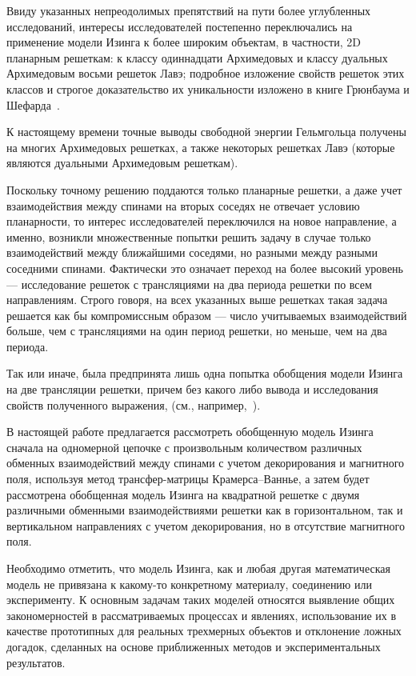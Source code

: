 Ввиду указанных непреодолимых препятствий на пути более углубленных исследований, интересы исследователей постепенно переключались на применение модели Изинга к более широким объектам, в частности, 2D планарным решеткам: к классу одиннадцати Архимедовых и классу дуальных Архимедовым восьми решеток Лавэ; подробное изложение свойств решеток этих классов и строгое доказательство их уникальности изложено в книге Грюнбаума и Шефарда~\cite{grunbaum1987}. 

К настоящему времени точные выводы свободной энергии Гельмгольца получены на многих Архимедовых  решетках, а также некоторых решетках Лавэ (которые являются дуальными Архимедовым решеткам).

Поскольку точному решению поддаются только планарные решетки, а даже учет взаимодействия между спинами на вторых соседях не отвечает условию планарности, то интерес исследователей переключился на новое направление, а именно, возникли множественные попытки решить задачу в случае только взаимодействий между ближайшими соседями, но разными между разными соседними спинами. Фактически это означает переход на более высокий уровень — исследование решеток с трансляциями на два периода решетки по всем направлениям. Строго говоря, на всех указанных выше решетках такая задача решается как бы компромиссным образом — число учитываемых взаимодействий больше, чем с трансляциями на один период решетки, но меньше, чем на два периода. 

Так или иначе, была предпринята лишь одна попытка обобщения модели Изинга на две трансляции решетки, причем без какого либо вывода и исследования свойств полученного выражения, (см., например,~\cite{utiyama1951, syozi1972}).

В настоящей работе предлагается рассмотреть обобщенную модель Изинга сначала на одномерной цепочке с произвольным количеством различных обменных взаимодействий между спинами с учетом декорирования и магнитного поля, используя метод трансфер-матрицы Крамерса--Ваннье, а затем будет рассмотрена обобщенная модель Изинга на квадратной решетке с двумя различными обменными взаимодействиями решетки как в горизонтальном, так и вертикальном направлениях с учетом декорирования, но в отсутствие магнитного поля.

Необходимо отметить, что модель Изинга, как и любая другая математическая модель не привязана к какому-то конкретному материалу, соединению или эксперименту. К основным задачам таких моделей относятся выявление общих закономерностей в рассматриваемых процессах и явлениях, использование их в качестве прототипных для реальных трехмерных объектов и отклонение ложных догадок, сделанных на основе приближенных методов и экспериментальных результатов. 

